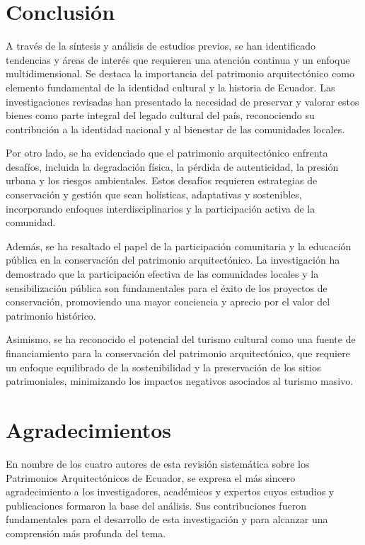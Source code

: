 \documentclass[journal,article,submit,pdftex,moreauthors]{Definitions/mdpi}
\begin{document}
\section{ Conclusión}
A través de la síntesis y análisis de estudios previos, se han identificado tendencias  y áreas de interés que requieren una atención continua y un enfoque multidimensional. Se destaca la importancia del patrimonio arquitectónico como elemento fundamental de la identidad cultural y la historia de Ecuador. Las investigaciones revisadas han presentado la necesidad de preservar y valorar estos bienes como parte integral del legado cultural del país, reconociendo su contribución a la identidad nacional y al bienestar de las comunidades locales.

Por otro lado, se ha evidenciado que el patrimonio arquitectónico enfrenta desafíos, incluida la degradación física, la pérdida de autenticidad, la presión urbana y los riesgos ambientales. Estos desafíos requieren estrategias de conservación y gestión que sean holísticas, adaptativas y sostenibles, incorporando enfoques interdisciplinarios y la participación activa de la comunidad.

Además, se ha resaltado el papel de la participación comunitaria y la educación pública en la conservación del patrimonio arquitectónico. La investigación ha demostrado que la participación efectiva de las comunidades locales y la sensibilización pública son fundamentales para el éxito de los proyectos de conservación, promoviendo una mayor conciencia y aprecio por el valor del patrimonio histórico.

Asimismo, se ha reconocido el potencial del turismo cultural como una fuente de financiamiento para la conservación del patrimonio arquitectónico, que requiere un enfoque equilibrado de la sostenibilidad y la preservación de los sitios patrimoniales, minimizando los impactos negativos asociados al turismo masivo.

\section{ Agradecimientos }
En nombre de los cuatro autores de esta revisión sistemática sobre los Patrimonios Arquitectónicos de Ecuador, se expresa el más sincero agradecimiento a los investigadores, académicos y expertos cuyos estudios y publicaciones formaron la base del análisis. Sus contribuciones fueron fundamentales para el desarrollo de esta investigación y para alcanzar una comprensión más profunda del tema.
\end{document}
